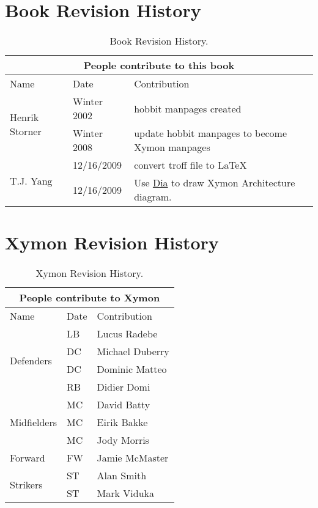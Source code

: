 \section{Book Revision History}
\begin{table}
\caption{Book Revision History.} \label{BookRevisionHistory}

\begin{tabular}{|l|l|l|}
\hline
\multicolumn{3}{|c|}{People contribute to this book} \\
\hline
Name  & Date  & Contribution  \\ \hline
\multirow{2}{*}{Henrik Storner} & Winter 2002  & hobbit manpages created \\
 & Winter 2008  & update hobbit manpages to become Xymon manpages \\ \hline
\multirow{2}{*}{T.J. Yang} & 12/16/2009 & convert troff file to \LaTeX{}\\
 & 12/16/2009 & Use \href{http://projects.gnome.org/dia/}{Dia} to draw Xymon Architecture diagram. \\ \hline
\end{tabular}
\end{table}

\section{Xymon Revision History}
\begin{table}
\caption{Xymon Revision History.} \label{XymonRevisionHistory}

\begin{tabular}{|l|l|l|}
\hline
\multicolumn{3}{|c|}{People contribute to Xymon} \\
\hline
Name  & Date  & Contribution  \\ \hline
\multirow{4}{*}{Defenders} & LB & Lucus Radebe \\
 & DC & Michael Duberry \\
 & DC & Dominic Matteo \\
 & RB & Didier Domi \\ \hline
\multirow{3}{*}{Midfielders} & MC & David Batty \\
 & MC & Eirik Bakke \\
 & MC & Jody Morris \\ \hline
Forward & FW & Jamie McMaster \\ \hline
\multirow{2}{*}{Strikers} & ST & Alan Smith \\
 & ST & Mark Viduka \\
\hline
\end{tabular}
\end{table}



